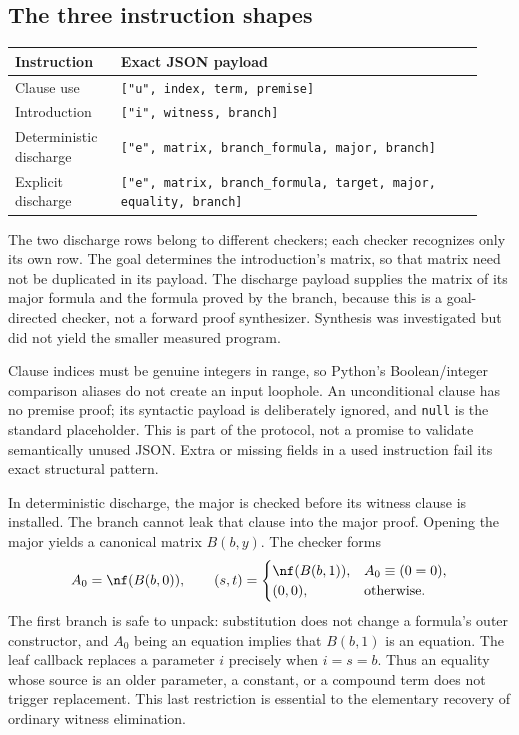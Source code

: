 \subsection{The three instruction shapes}

\begin{center}
\small
\begin{tabular}{@{}>{\raggedright\arraybackslash}p{0.21\linewidth}p{0.72\linewidth}@{}}
\toprule
Instruction & Exact JSON payload\\
\midrule
Clause use & \texttt{["u", index, term, premise]}\\[3pt]
Introduction & \texttt{["i", witness, branch]}\\[3pt]
Deterministic discharge &
\texttt{["e", matrix, branch\_formula, major, branch]}\\[3pt]
Explicit discharge &
\texttt{["e", matrix, branch\_formula, target, major, equality, branch]}\\
\bottomrule
\end{tabular}
\end{center}

The two discharge rows belong to different checkers; each checker recognizes
only its own row. The goal determines the introduction's matrix, so that
matrix need not be duplicated in its payload. The discharge payload supplies
the matrix of its major formula and the formula proved by the branch,
because this is a goal-directed checker, not a forward proof synthesizer.
Synthesis was investigated but did not yield the smaller measured program.

Clause indices must be genuine integers in range, so Python's Boolean/integer
comparison aliases do not create an input loophole. An unconditional clause
has no premise proof; its syntactic payload is deliberately ignored, and
\texttt{null} is the standard placeholder. This is part of the protocol,
not a promise to validate semantically unused JSON. Extra or missing fields
in a used instruction fail its exact structural pattern.

In deterministic discharge, the major is checked before its witness clause
is installed. The branch cannot leak that clause into the major proof.
Opening the major yields a canonical matrix $B(b,y)$. The checker forms
\[
  A_0=\nf(B(b,0)),\qquad
  (s,t)=
  \begin{cases}
   \nf(B(b,1)),&A_0\equiv(0=0),\\
   (0,0),&\text{otherwise}.
  \end{cases}
\]
The first branch is safe to unpack: substitution does not change a formula's
outer constructor, and $A_0$ being an equation implies that $B(b,1)$ is an
equation. The leaf callback replaces a parameter $i$ precisely when
$i=s=b$. Thus an equality whose source is an older parameter, a constant,
or a compound term does not trigger replacement. This last restriction is
essential to the elementary recovery of ordinary witness elimination.

